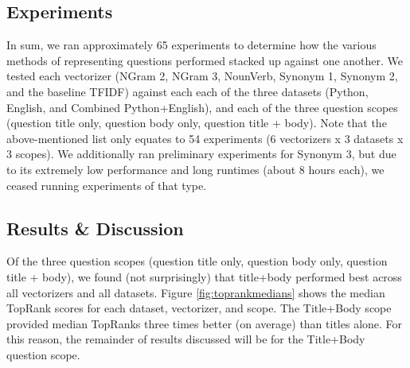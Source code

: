 \documentclass{acm_proc_article-sp}
\begin{document}
\subsection{Experiments}
In sum, we ran approximately 65 experiments to determine how the various methods of representing questions performed stacked up against one another. We tested each vectorizer (NGram 2, NGram 3, NounVerb, Synonym 1, Synonym 2, and the baseline TFIDF) against each each of the three datasets (Python, English, and Combined Python+English), and each of the three question scopes (question title only, question body only, question title + body). 
Note that the above-mentioned list only equates to 54 experiments (6 vectorizers x 3 datasets x 3 scopes). We additionally ran preliminary experiments for Synonym 3, but due to its extremely low performance and long runtimes (about 8 hours each), we ceased running experiments of that type.

\subsection{Results \& Discussion}
Of the three question scopes (question title only, question body only, question title + body), we found (not surprisingly) that title+body performed best across all vectorizers and all datasets. Figure \ref{fig:toprankmedians} shows the median TopRank scores for each dataset, vectorizer, and scope. The Title+Body scope provided median TopRanks three times better (on average) than titles alone. For this reason, the remainder of results discussed will be for the Title+Body question scope.
\end{document}
